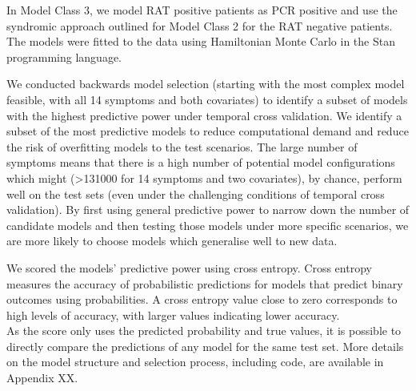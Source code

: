 \documentclass[]{elsarticle} %
\begin{document}
In Model Class 3, we model RAT positive patients as PCR positive and use
the syndromic approach outlined for Model Class 2 for the RAT negative
patients. The models were fitted to the data using Hamiltonian Monte
Carlo in the Stan programming language.

We conducted backwards model selection (starting with the most complex
model feasible, with all 14 symptoms and both covariates) to identify a
subset of models with the highest predictive power under temporal cross
validation. We identify a subset of the most predictive models to reduce
computational demand and reduce the risk of overfitting models to the
test scenarios. The large number of symptoms means that there is a high
number of potential model configurations which might (\textgreater131000
for 14 symptoms and two covariates), by chance, perform well on the test
sets (even under the challenging conditions of temporal cross
validation). By first using general predictive power to narrow down the
number of candidate models and then testing those models under more
specific scenarios, we are more likely to choose models which generalise
well to new data.

We scored the models' predictive power using cross entropy. Cross
entropy measures the accuracy of probabilistic predictions for models
that predict binary outcomes using probabilities. A cross entropy value
close to zero corresponds to high levels of accuracy, with larger values
indicating lower accuracy.\\
As the score only uses the predicted probability and true values, it is
possible to directly compare the predictions of any model for the same
test set. More details on the model structure and selection process,
including code, are available in Appendix XX.
\end{document}
